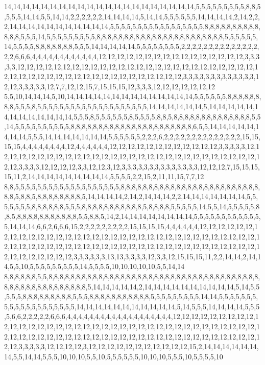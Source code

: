 14,14,14,14,14,14,14,14,14,14,14,14,14,14,14,14,14,14,14,14,14,5,5,5,5,5,5,5,5,5,8,8,5,5,5,5,14,14,5,5,14,14,2,2,2,2,2,2,14,14,14,14,5,14,14,5,5,5,5,5,5,14,14,14,14,2,14,2,2,2,14,14,14,14,14,14,14,14,14,14,14,5,5,5,5,5,5,5,5,5,5,5,5,5,5,5,5,5,8,8,8,8,8,8,8,8,8,8,8,8,8,5,5,5,14,5,5,5,5,5,5,5,5,5,8,8,8,8,8,8,8,8,8,8,8,8,8,8,8,8,8,8,8,8,8,8,8,5,5,5,5,5,5,14,5,5,5,5,8,8,8,8,8,8,8,5,5,5,14,14,14,14,14,5,5,5,5,5,5,5,5,2,2,2,2,2,2,2,2,2,2,2,2,2,2,2,2,6,6,6,4,4,4,4,4,4,4,4,4,4,4,4,12,12,12,12,12,12,12,12,12,12,12,12,12,12,12,12,3,3,3,3,3,12,12,12,12,12,12,12,12,12,12,12,12,12,12,12,12,12,12,12,12,12,12,12,12,12,12,12,12,12,12,12,12,12,12,12,12,12,12,12,12,12,12,12,12,12,12,3,3,3,3,3,3,3,3,3,3,3,3,3,12,12,3,3,3,3,3,12,7,7,12,12,15,7,15,15,15,12,3,3,3,12,12,12,12,12,12,12
5,5,10,14,14,14,5,10,14,14,14,14,14,14,14,14,14,14,14,14,14,14,5,5,5,5,5,5,8,8,8,8,8,8,8,8,5,5,5,8,5,5,5,5,5,5,5,5,5,5,5,5,5,5,5,5,5,5,5,5,14,14,14,14,14,14,5,14,14,14,14,14,14,14,14,14,14,14,14,14,5,5,5,8,5,5,5,5,5,5,8,5,5,5,5,8,8,5,8,8,8,8,8,8,8,8,8,8,8,8,8,8,5,5,14,5,5,5,5,5,5,5,5,5,5,8,8,8,8,8,8,8,8,8,8,8,8,8,8,8,8,8,8,8,8,8,8,6,5,5,14,14,14,14,14,14,14,14,5,5,5,14,14,14,14,14,14,14,5,5,5,5,5,5,2,2,2,6,2,2,2,2,2,2,2,2,2,2,2,2,2,2,15,15,15,15,4,4,4,4,4,4,4,4,12,4,4,4,4,4,4,12,12,12,12,12,12,12,12,12,12,12,12,3,3,3,3,3,12,12,12,12,12,12,12,12,12,12,12,12,12,12,12,12,12,12,12,12,12,12,12,12,12,12,12,12,12,12,12,3,3,3,3,12,12,12,12,3,3,12,12,3,12,3,3,3,3,3,3,3,3,3,3,3,3,3,3,12,12,12,7,15,15,15,15,11,2,14,14,14,14,14,14,14,14,14,5,5,5,5,2,2,15,2,11,11,15,7,7,12
8,8,5,5,5,5,5,5,5,5,5,5,5,5,5,5,5,5,5,5,5,8,8,8,8,8,8,8,8,8,8,8,8,8,8,8,8,8,8,8,8,8,8,8,8,8,8,8,5,8,8,5,8,8,8,8,8,8,8,8,5,14,14,14,14,2,14,2,14,14,14,2,2,14,14,14,14,14,14,14,5,5,5,5,5,5,5,8,8,8,8,8,8,5,5,5,8,8,8,8,8,8,8,8,8,8,8,5,8,8,8,8,5,5,5,5,5,14,5,5,14,5,5,5,5,5,8,8,5,8,8,8,8,8,8,8,8,8,8,8,5,5,8,8,5,14,2,14,14,14,14,14,14,14,14,5,5,5,5,5,5,5,5,5,5,5,5,5,14,14,14,6,6,2,6,6,6,15,2,2,2,2,2,2,2,2,2,15,15,15,15,4,4,4,4,4,4,12,12,12,12,12,12,12,12,12,12,12,12,12,12,12,12,12,12,12,12,12,12,12,12,12,12,12,12,12,12,12,12,12,12,12,12,12,12,12,12,12,12,12,12,12,12,12,12,12,12,12,12,12,12,12,12,12,12,12,12,12,12,12,12,12,12,12,12,12,12,3,3,3,3,3,3,13,13,3,3,3,3,12,3,3,12,15,15,15,11,2,2,14,14,2,14,14,5,5,10,5,5,5,5,5,5,5,5,5,14,5,5,5,5,10,10,10,10,10,5,5,14,14
8,8,8,8,8,8,5,5,8,8,8,8,8,8,8,8,8,8,8,8,8,8,8,8,8,8,8,8,8,8,8,8,8,8,8,8,8,8,8,8,8,8,8,8,8,8,8,8,8,8,8,8,8,8,8,8,8,8,8,8,8,5,14,14,14,14,14,2,14,14,14,14,14,14,14,14,14,14,5,14,5,5,5,5,5,8,8,8,8,8,8,8,8,8,5,5,5,8,8,8,8,8,8,8,8,8,8,8,5,5,5,5,5,5,5,5,5,14,14,5,5,5,5,5,5,5,5,5,5,5,5,5,5,5,5,5,5,5,5,14,14,14,14,14,14,14,14,14,14,14,5,14,5,5,5,14,14,14,14,5,5,5,5,6,6,2,2,2,2,2,6,6,6,4,4,4,4,4,4,4,4,4,4,4,4,4,4,4,4,4,4,4,12,12,12,12,12,12,12,12,12,12,12,12,12,12,12,12,12,12,12,12,12,12,12,12,12,12,12,12,12,12,12,12,12,12,12,12,12,12,12,12,12,12,12,12,12,12,12,12,12,12,12,12,12,12,12,12,12,12,12,12,12,12,12,12,12,12,12,3,3,3,3,3,12,12,12,12,3,12,12,12,12,12,12,12,12,12,12,12,15,2,14,14,14,14,14,14,14,5,5,14,14,5,5,5,10,10,10,5,5,10,5,5,5,5,5,5,10,10,10,5,5,5,10,5,5,5,5,10
